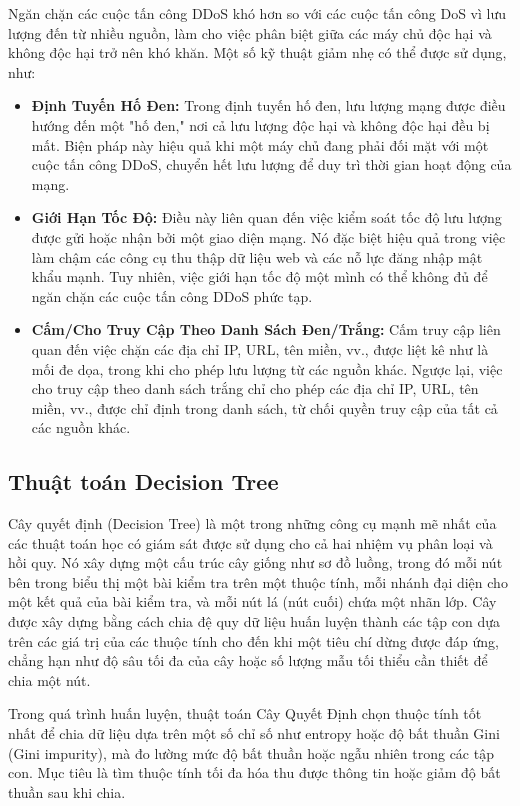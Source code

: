 \documentclass[a4paper]{article}
\begin{document}
Ngăn chặn các cuộc tấn công DDoS khó hơn so với các cuộc tấn công DoS vì lưu lượng đến từ nhiều nguồn, làm cho việc phân biệt giữa các máy chủ độc hại và không độc hại trở nên khó khăn. Một số kỹ thuật giảm nhẹ có thể được sử dụng, như:

\begin{itemize}
    \item \textbf{Định Tuyến Hố Đen:} Trong định tuyến hố đen, lưu lượng mạng được điều hướng đến một "hố đen," nơi cả lưu lượng độc hại và không độc hại đều bị mất. Biện pháp này hiệu quả khi một máy chủ đang phải đối mặt với một cuộc tấn công DDoS, chuyển hết lưu lượng để duy trì thời gian hoạt động của mạng.

    \item \textbf{Giới Hạn Tốc Độ:} Điều này liên quan đến việc kiểm soát tốc độ lưu lượng được gửi hoặc nhận bởi một giao diện mạng. Nó đặc biệt hiệu quả trong việc làm chậm các công cụ thu thập dữ liệu web và các nỗ lực đăng nhập mật khẩu mạnh. Tuy nhiên, việc giới hạn tốc độ một mình có thể không đủ để ngăn chặn các cuộc tấn công DDoS phức tạp.

    \item \textbf{Cấm/Cho Truy Cập Theo Danh Sách Đen/Trắng:} Cấm truy cập liên quan đến việc chặn các địa chỉ IP, URL, tên miền, vv., được liệt kê như là mối đe dọa, trong khi cho phép lưu lượng từ các nguồn khác. Ngược lại, việc cho truy cập theo danh sách trắng chỉ cho phép các địa chỉ IP, URL, tên miền, vv., được chỉ định trong danh sách, từ chối quyền truy cập của tất cả các nguồn khác.
\end{itemize}
\subsection{Thuật toán Decision Tree}
Cây quyết định (Decision Tree) là một trong những công cụ mạnh mẽ nhất của các thuật toán học có giám sát được sử dụng cho cả hai nhiệm vụ phân loại và hồi quy. Nó xây dựng một cấu trúc cây giống như sơ đồ luồng, trong đó mỗi nút bên trong biểu thị một bài kiểm tra trên một thuộc tính, mỗi nhánh đại diện cho một kết quả của bài kiểm tra, và mỗi nút lá (nút cuối) chứa một nhãn lớp. Cây được xây dựng bằng cách chia đệ quy dữ liệu huấn luyện thành các tập con dựa trên các giá trị của các thuộc tính cho đến khi một tiêu chí dừng được đáp ứng, chẳng hạn như độ sâu tối đa của cây hoặc số lượng mẫu tối thiểu cần thiết để chia một nút.

Trong quá trình huấn luyện, thuật toán Cây Quyết Định chọn thuộc tính tốt nhất để chia dữ liệu dựa trên một số chỉ số như entropy hoặc độ bất thuần Gini (Gini impurity), mà đo lường mức độ bất thuần hoặc ngẫu nhiên trong các tập con. Mục tiêu là tìm thuộc tính tối đa hóa thu được thông tin hoặc giảm độ bất thuần sau khi chia.
\end{document}
